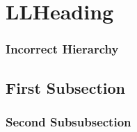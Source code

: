 \section{LLHeading}

\subsubsection{Incorrect Hierarchy}

\subsection{First Subsection}
\subsubsection{Second Subsubsection}
